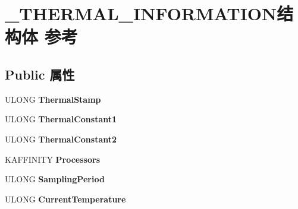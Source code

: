 \hypertarget{struct___t_h_e_r_m_a_l___i_n_f_o_r_m_a_t_i_o_n}{}\section{\+\_\+\+T\+H\+E\+R\+M\+A\+L\+\_\+\+I\+N\+F\+O\+R\+M\+A\+T\+I\+O\+N结构体 参考}
\label{struct___t_h_e_r_m_a_l___i_n_f_o_r_m_a_t_i_o_n}
\subsection*{Public 属性}
\begin{DoxyCompactItemize}
\item 
\mbox{\label{struct___t_h_e_r_m_a_l___i_n_f_o_r_m_a_t_i_o_n_a0c1fd5a2ce53d3d8241f57a6eaec7cb4}} 
U\+L\+O\+NG {\bfseries Thermal\+Stamp}
\item 
\mbox{\label{struct___t_h_e_r_m_a_l___i_n_f_o_r_m_a_t_i_o_n_a4d164ff6f359706d077fd74714b930d0}} 
U\+L\+O\+NG {\bfseries Thermal\+Constant1}
\item 
\mbox{\label{struct___t_h_e_r_m_a_l___i_n_f_o_r_m_a_t_i_o_n_a131f48b0e330886e139782b0c857db0d}} 
U\+L\+O\+NG {\bfseries Thermal\+Constant2}
\item 
\mbox{\label{struct___t_h_e_r_m_a_l___i_n_f_o_r_m_a_t_i_o_n_af95505f6bdd341908ee82eb59f91e294}} 
K\+A\+F\+F\+I\+N\+I\+TY {\bfseries Processors}
\item 
\mbox{\label{struct___t_h_e_r_m_a_l___i_n_f_o_r_m_a_t_i_o_n_a0f5c6286083c2e3242469627402a3946}} 
U\+L\+O\+NG {\bfseries Sampling\+Period}
\item 
\mbox{\label{struct___t_h_e_r_m_a_l___i_n_f_o_r_m_a_t_i_o_n_a2c143f4b00ca5466c534bdaabe075ce0}} 
U\+L\+O\+NG {\bfseries Current\+Temperature}
\item 
\mbox{\label{struct___t_h_e_r_m_a_l___i_n_f_o_r_m_a_t_i_o_n_ace60d6dca7b7258a6843da0b0f6ff328}} 

\end{DoxyCompactItemize}
